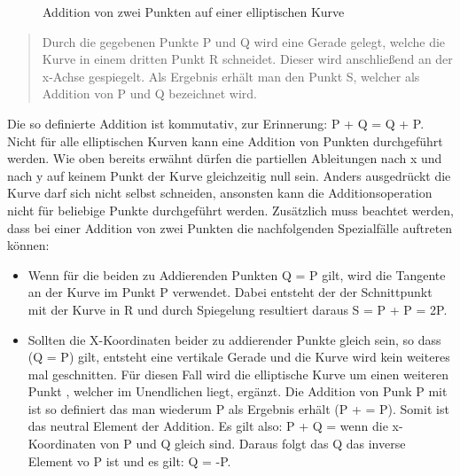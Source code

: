 		\begin{figure}
			\centering
			\caption{Addition von zwei Punkten auf einer elliptischen Kurve~\cite{Information:und:Kommunikation}}
			\label{ABBILDUNG_elliptischenKurveAddition}
		\end{figure}
		
		\begin{quote}
			\begin{defi}
				Durch die gegebenen Punkte P und Q wird eine Gerade gelegt, welche die Kurve in einem dritten Punkt R schneidet. Dieser wird anschließend an der x-Achse 
				gespiegelt. Als Ergebnis erhält man den Punkt S, welcher als Addition von P und Q bezeichnet wird.\cite{Information:und:Kommunikation}
			\end{defi}
		\end{quote}
		
		Die so definierte Addition ist kommutativ, zur Erinnerung: P + Q = Q + P. Nicht für alle elliptischen Kurven kann eine Addition von Punkten durchgeführt werden. Wie oben bereits erwähnt dürfen die partiellen Ableitungen nach x und nach y auf keinem Punkt der Kurve gleichzeitig null sein. Anders ausgedrückt die Kurve darf sich nicht selbst schneiden, ansonsten kann die Additionsoperation nicht für beliebige Punkte durchgeführt werden.
		Zusätzlich muss beachtet werden, dass bei einer Addition von zwei Punkten die nachfolgenden Spezialfälle auftreten können\cite{Information:und:Kommunikation}:
		
		\begin{itemize}
			\item Wenn für die beiden zu Addierenden Punkten Q = P gilt, wird die Tangente an der Kurve im Punkt P verwendet. Dabei entsteht der der Schnittpunkt mit der Kurve in R und durch Spiegelung resultiert daraus S = P + P = 2P.
			\item Sollten die X-Koordinaten beider zu addierender Punkte gleich sein, so dass (Q = P) gilt, entsteht eine vertikale Gerade und die Kurve wird kein weiteres mal geschnitten. Für diesen Fall wird die elliptische Kurve um einen weiteren Punkt \myInftyOhne, welcher im Unendlichen liegt, ergänzt. Die Addition von Punk P mit \myInfty ist so definiert das man wiederum P als Ergebnis erhält (P + \myInfty = P). Somit ist \myInfty das neutral Element der Addition. Es gilt also: P + Q = \myInfty wenn die x-Koordinaten von P und Q gleich sind. Daraus folgt das Q das inverse Element vo P ist und es gilt: Q = -P.
		\end{itemize}
		
